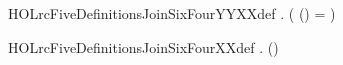 \newcommand{\HOLrcFiveDate}{24 October 2024}
\newcommand{\HOLrcFiveTime}{01:12}
\begin{SaveVerbatim}{HOLrcFiveDefinitionsJoinSixFourYYXXdef}
\HOLTokenTurnstile{} \HOLSymConst{\HOLTokenForall{}}.   \HOLSymConst{=} ( (\HOLSymConst{,}) =     )
\end{SaveVerbatim}
\newcommand{\HOLrcFiveDefinitionsJoinSixFourYYXXdef}{\UseVerbatim{HOLrcFiveDefinitionsJoinSixFourYYXXdef}}
\begin{SaveVerbatim}{HOLrcFiveDefinitionsJoinSixFourXXdef}
\HOLTokenTurnstile{} \HOLSymConst{\HOLTokenForall{}} .  (\HOLSymConst{,}) \HOLSymConst{=}   
\end{SaveVerbatim}
\newcommand{\HOLrcFiveDefinitionsJoinSixFourXXdef}{\UseVerbatim{HOLrcFiveDefinitionsJoinSixFourXXdef}}
